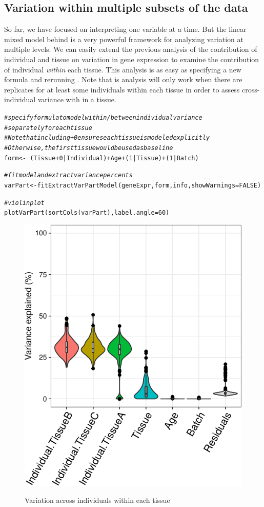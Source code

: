 \documentclass[12pt]{article}\usepackage[]{graphicx}\usepackage[]{xcolor}
\newcommand{\hlnum}[1]{\textcolor[rgb]{0.816,0.125,0.439}{#1}}%
\newcommand{\hlcom}[1]{\textcolor[rgb]{0.502,0.502,0.502}{\textit{#1}}}%
\newcommand{\hlopt}[1]{\textcolor[rgb]{0,0,0}{#1}}%
\newcommand{\hlstd}[1]{\textcolor[rgb]{0.251,0.251,0.251}{#1}}%
\newcommand{\hlkwb}[1]{\textcolor[rgb]{0,0,0}{#1}}%
\newcommand{\hlkwc}[1]{\textcolor[rgb]{0.251,0.251,0.251}{#1}}%
\newcommand{\hlkwd}[1]{\textcolor[rgb]{0.878,0.439,0.125}{#1}}%
\newenvironment{knitrout}{}{} %
\begin{document}
\subsection{Variation within multiple subsets of the data}
\label{sec:withinSubset}

So far, we have focused on interpreting one variable at a time. But the linear mixed model behind  is a very powerful framework for analyzing variation at multiple levels.  We can easily extend the previous analysis of the contribution of individual and tissue on variation in gene expression to examine the contribution of individual {\it within} each tissue.  This analysis is as easy as specifying a new formula and rerunning  .  Note that is analysis will only work when there are replicates for at least some individuals within each tissue in order to assess cross-individual variance with in a tissue.

\begin{knitrout}
\color{fgcolor}\begin{kframe}
\begin{alltt}
\hlcom{# specify formula to model within/between individual variance}
\hlcom{# separately for each tissue}
\hlcom{# Note that including +0 ensures each tissue is modeled explicitly}
\hlcom{# Otherwise, the first tissue would be used as baseline}
\hlstd{form} \hlkwb{<-} \hlopt{~} \hlstd{(Tissue} \hlopt{+} \hlnum{0} \hlopt{|} \hlstd{Individual)} \hlopt{+} \hlstd{Age} \hlopt{+} \hlstd{(}\hlnum{1} \hlopt{|} \hlstd{Tissue)} \hlopt{+} \hlstd{(}\hlnum{1} \hlopt{|} \hlstd{Batch)}

\hlcom{# fit model and extract variance percents}
\hlstd{varPart} \hlkwb{<-} \hlkwd{fitExtractVarPartModel}\hlstd{(geneExpr, form, info,} \hlkwc{showWarnings} \hlstd{=} \hlnum{FALSE}\hlstd{)}

\hlcom{# violin plot}
\hlkwd{plotVarPart}\hlstd{(}\hlkwd{sortCols}\hlstd{(varPart),} \hlkwc{label.angle} \hlstd{=} \hlnum{60}\hlstd{)}
\end{alltt}
\end{kframe}
\end{knitrout}

\begin{figure}[h]
\centering
\caption{ Variation across individuals within each tissue}
\includegraphics[width=.5\textwidth]{figure/withinTissue-1}
\label{fig:withinTissue}
\end{figure}
\end{document}

